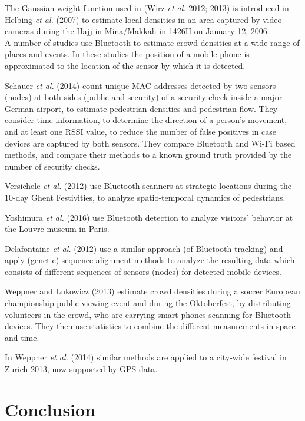 \documentclass[10pt,a4paper]{article}
\begin{document}
The Gaussian weight function used in (Wirz \textit{et al.} 2012; 2013) \cite{wirz:1}\cite{wirz:2} is introduced in Helbing \textit{et al.} (2007) \cite{helbing:1} to estimate local densities in an area captured by video cameras during the Hajj in Mina/Makkah in 1426H on January 12, 2006.\\

A number of studies use Bluetooth to estimate crowd densities at a wide range of places and events.
In these studies the position of a mobile phone is approximated to the location of the sensor by which it is detected.

Schauer \textit{et al.} (2014) \cite{schauer:1} count unique MAC addresses detected by two sensors (nodes) at both sides (public and security) of a security check inside a major German airport, to estimate pedestrian densities and pedestrian flow. They consider time information, to determine the direction of a person's movement, and at least one RSSI value, to reduce the number of false positives in case devices are captured by both sensors. They compare Bluetooth and Wi-Fi based methods, and compare their methods to a known ground truth provided by the number of security checks.

Versichele \textit{et al.} (2012) \cite{versichele:1} use Bluetooth scanners at strategic locations during the 10-day Ghent Festivities, to analyze spatio-temporal dynamics of pedestrians. 

Yoshimura \textit{et al.} (2016) \cite{yoshimura:1} use Bluetooth detection to analyze visitors' behavior at the Louvre museum in Paris.

Delafontaine \textit{et al.} (2012) \cite{delafontaine:1} use a similar approach (of Bluetooth tracking) and apply (genetic) sequence alignment methods to analyze the resulting data which consists of different sequences of sensors (nodes) for detected mobile devices.

Weppner and Lukowicz (2013) \cite{weppner:1} estimate crowd densities during a soccer European championship public viewing event and during the Oktoberfest, by distributing volunteers in the crowd, who are carrying smart phones scanning for Bluetooth devices. They then use statistics to combine the different measurements in space and time.

In Weppner \textit{et al.} (2014) \cite{weppner:2} similar methods are applied to a city-wide festival in Zurich 2013, now supported by GPS data.



\section{Conclusion}





\end{document}
